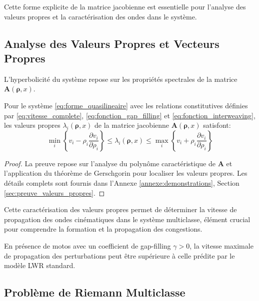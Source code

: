 Cette forme explicite de la matrice jacobienne est essentielle pour l'analyse des valeurs propres et la caractérisation des ondes dans le système.

\subsection{Analyse des Valeurs Propres et Vecteurs Propres}
\label{subsec:valeurs_propres}

L'hyperbolicité du système repose sur les propriétés spectrales de la matrice $\mathbf{A}(\boldsymbol{\rho}, x)$.

\begin{theorem}
Pour le système \eqref{eq:forme_quasilineaire} avec les relations constitutives définies par \eqref{eq:vitesse_complete}, \eqref{eq:fonction_gap_filling} et \eqref{eq:fonction_interweaving}, les valeurs propres $\lambda_i(\boldsymbol{\rho}, x)$ de la matrice jacobienne $\mathbf{A}(\boldsymbol{\rho}, x)$ satisfont:
\begin{equation}
\min_{i} \left\{v_i - \rho_i \frac{\partial v_i}{\partial \rho_i}\right\} \leq \lambda_i(\boldsymbol{\rho}, x) \leq \max_{i} \left\{v_i + \rho_i \frac{\partial v_i}{\partial \rho_i}\right\}
\end{equation}
\end{theorem}

\begin{proof}
La preuve repose sur l'analyse du polynôme caractéristique de $\mathbf{A}$ et l'application du théorème de Gerschgorin pour localiser les valeurs propres. Les détails complets sont fournis dans l'Annexe \ref{annexe:demonstrations}, Section \ref{sec:preuve_valeurs_propres}.
\end{proof}

Cette caractérisation des valeurs propres permet de déterminer la vitesse de propagation des ondes cinématiques dans le système multiclasse, élément crucial pour comprendre la formation et la propagation des congestions.

\begin{corollary}
En présence de motos avec un coefficient de gap-filling $\gamma > 0$, la vitesse maximale de propagation des perturbations peut être supérieure à celle prédite par le modèle LWR standard.
\end{corollary}

\subsection{Problème de Riemann Multiclasse}
\label{subsec:riemann_multiclasse}

